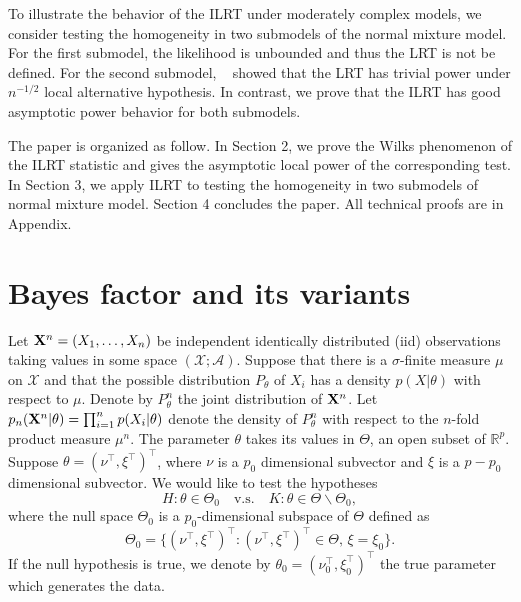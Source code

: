 \documentclass[11pt]{article}
\theoremstyle{plain}
\theoremstyle{definition}
\theoremstyle{remark}
\begin{document}
To illustrate the behavior of the ILRT under moderately complex models, we consider testing the homogeneity in two submodels of the normal mixture model.
For the first submodel, the likelihood is unbounded and thus the LRT is not be defined.
For the second submodel, %
~\cite{HALL2005158} showed that the LRT has trivial power under $n^{-1/2}$ local alternative hypothesis. 
In contrast, we prove that the ILRT has good asymptotic power behavior for both submodels.



The paper is organized as follow.
In Section 2, we prove the Wilks phenomenon of the ILRT statistic and gives the asymptotic local power of the corresponding test.
In Section 3, we apply ILRT to testing the homogeneity in two submodels of normal mixture model.
Section 4 concludes the paper.
All technical proofs are in Appendix.






\section{Bayes factor and its variants}


Let $\mathbf{X}^{n}=(X_1,\ldots,X_n)$ be independent identically distributed (iid) observations taking values in some space $(\mathcal{X};\mathscr{A})$.
Suppose that there is a $\sigma$-finite measure $\mu$ on $\mathcal{X}$ and that the  possible distribution $P_\theta$ of $X_i$ has a density $p(X|\theta)$ with respect to $\mu$.
Denote by $P_{\theta}^{n}$ the joint distribution of $\mathbf{X}^{n}$.
Let $p_{n}(\mathbf{X}^{n}|\theta)=\prod_{i=1}^n p(X_i|\theta)$ denote the density of $P_{\theta}^n$ with respect to the $n$-fold product measure $\mu^n$.
The parameter $\theta$ takes its values in $\Theta$, an open subset of $\mathbb{R}^{p}$.
Suppose $\theta=(\nu^\top ,\xi^\top )^\top $, where $\nu$ is a $p_0$ dimensional subvector and $\xi$ is a $p-p_0$ dimensional subvector.
 We would like to test the hypotheses
\begin{equation*}
    H:\theta\in\Theta_0\quad \text{v.s.}\quad K:\theta\in\Theta\backslash \Theta_0,
\end{equation*}
where the null space $\Theta_0$ is a $p_0$-dimensional subspace of $\Theta$ defined as
\begin{equation*}
    \Theta_0=\{(\nu^\top ,\xi^\top )^\top :(\nu^\top ,\xi^\top )^\top \in\Theta, \, \xi=\xi_0\}.
\end{equation*}
If the null hypothesis is true, we denote by $\theta_0=(\nu_0^\top ,\xi_0^\top )^\top $ the true parameter which generates the data.
\end{document}
